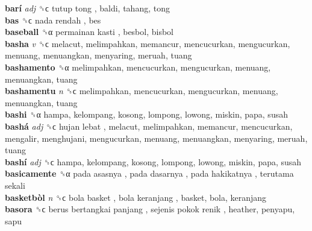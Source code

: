 \textbf{barí} \emph{adj}  ␝ϲ   tutup tong , baldi, tahang, tong  \\
\textbf{bas} ␝ϲ   nada rendah , bes  \\
\textbf{baseball} ␝α   permainan kasti , besbol, bisbol  \\
\textbf{basha} \emph{v}  ␝ϲ  melacut, melimpahkan, memancur, mencucurkan, mengucurkan, menuang, menuangkan, menyaring, meruah, tuang  \\
\textbf{bashamento} ␝α  melimpahkan, mencucurkan, mengucurkan, menuang, menuangkan, tuang  \\
\textbf{bashamentu} \emph{n}  ␝ϲ  melimpahkan, mencucurkan, mengucurkan, menuang, menuangkan, tuang  \\
\textbf{bashi} ␝α  hampa, kelompang, kosong, lompong, lowong, miskin, papa, susah  \\
\textbf{bashá} \emph{adj}  ␝ϲ   hujan lebat , melacut, melimpahkan, memancur, mencucurkan, mengalir, menghujani, mengucurkan, menuang, menuangkan, menyaring, meruah, tuang  \\
\textbf{bashí} \emph{adj}  ␝ϲ  hampa, kelompang, kosong, lompong, lowong, miskin, papa, susah  \\
\textbf{basicamente} ␝α   pada asasnya ,  pada dasarnya ,  pada hakikatnya ,  terutama sekali   \\
\textbf{basketbòl} \emph{n}  ␝ϲ   bola basket ,  bola keranjang , basket, bola, keranjang  \\
\textbf{basora} ␝ϲ   berus bertangkai panjang ,  sejenis pokok renik , heather, penyapu, sapu  \\
